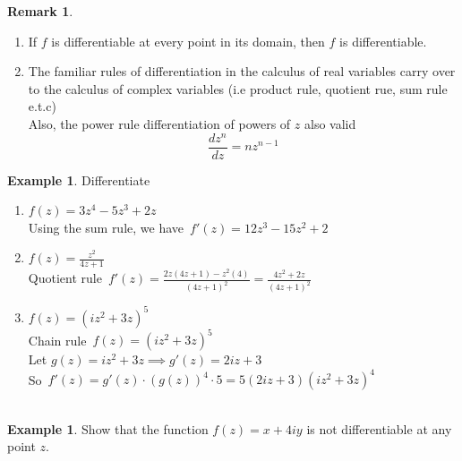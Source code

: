 \documentclass[11pt,a4paper]{article}
\theoremstyle{definition}
\newtheorem{example}[thm]{Example}
\newtheorem{remark}[thm]{Remark}
\begin{document}
\begin{remark}
\begin{enumerate}
\item If $f$ is differentiable at every point in its domain, then $f$ is differentiable.
\item The familiar rules of differentiation in the calculus of real variables carry over to the calculus of complex variables (i.e product rule, quotient rue, sum rule e.t.c)\\
Also, the power rule differentiation of powers of $z$ also valid $$ \frac{dz^n}{dz} = nz^{n - 1}$$
\end{enumerate}





\begin{example}
Differentiate
\begin{enumerate}
\item $f(z) = 3z^4 - 5z^3 + 2z$\\

Using the sum rule, we have $\, f'(z) = 12z^3 - 15z^2 + 2$

\item $f(z) = \frac{z^2}{4z + 1}$\\

Quotient rule $\, f'(z) = \frac{2z (4z + 1) - z^2 (4)}{(4z + 1)^2} = \frac{4z^2 + 2z}{(4z + 1)^2}$


\item $f(z) = (iz^2 + 3z)^5$\\

Chain rule $\, f(z) = (iz^2 + 3z)^5$\\

Let $g(z) = iz^2 + 3z \implies g'(z) = 2iz + 3$\\

So $\, f'(z) = g'(z)\cdot (g(z))^4\cdot 5= 5(2iz + 3)(iz^2 + 3z)^4$\\\\
\end{enumerate}
\end{example}

\begin{example}
Show that the function $f(z) = x  + 4iy $ is not differentiable at any point $z$.\\


\end{example}
\end{remark}
\end{document}
